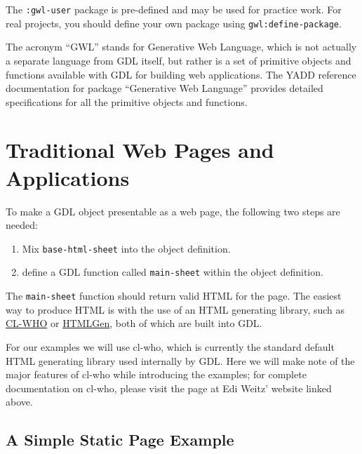 \documentclass [11pt]{book}
\begin{document}
The \texttt{:gwl-user} package is pre-defined and may be used for practice
work. For real projects, you should define your own package using \texttt{gwl:define-package}.



The acronym ``GWL'' stands for Generative Web Language,
which is not actually a separate language from GDL itself, but rather
is a set of primitive objects and functions available with GDL for
building web applications. The YADD reference documentation for
package ``Generative Web Language'' provides detailed specifications
for all the primitive objects and functions.



\section{Traditional Web Pages and Applications}

\label{sec:traditionalwebpagesandapplications}



To make a GDL object presentable as a web page, the following two
steps are needed:

\begin{enumerate}

\item Mix \texttt{base-html-sheet} into the object definition.

\item define a GDL function called \texttt{main-sheet} within the object definition.

\end{enumerate}

The \texttt{main-sheet} function should return valid
HTML for the page. The easiest way to produce HTML is with the use of
an HTML generating library, such as \href{http://weitz.de/cl-who}{CL-WHO} or \href{http://www.franz.com/support/documentation/current/doc/aserve/htmlgen.html}{HTMLGen}, both of which are built into GDL.



For our examples we will use cl-who, which is currently the
standard default HTML generating library used internally by
GDL. Here we will make note of the major features of cl-who while
introducing the examples; for complete documentation on cl-who, please
visit the page at Edi Weitz' website linked above.



\subsection{A Simple Static Page Example}
\end{document}
